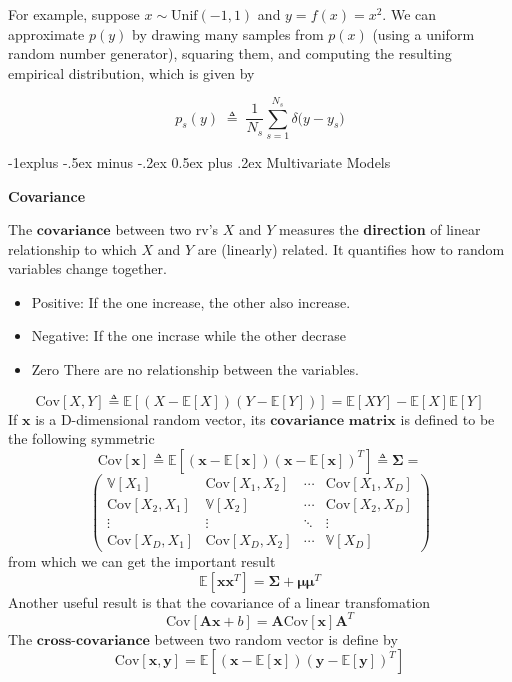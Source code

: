 \documentclass[10pt,landscape]{article}
\makeatletter
\newcommand{\cov}{\textrm{Cov}}
\newcommand{\mean}{\mathbb{E}}
\newcommand{\var}{\mathbb{V}}
\newcommand{\inp}{\textbf{x}}
\newcommand{\out}{\textbf{y}}
\newcommand{\Cov}{\mathbf{\Sigma}}
\newcommand{\Mean}{\boldsymbol{\mu}}
\renewcommand{\subsection}{\@startsection{subsection}{2}{0mm}%
                                {-1explus -.5ex minus -.2ex}%
                                {0.5ex plus .2ex}%
                                {\normalfont\normalsize\bfseries}}
\makeatother
\begin{document}
\begin{multicols*}{3}
For example, suppose $x \sim \mathrm{Unif}(-1,1)$ and $y = f(x) = x^2$. 
We can approximate $p(y)$ by drawing many samples from $p(x)$ 
(using a uniform random number generator), squaring them, and 
computing the resulting empirical distribution, which is given by

\begin{equation*}
p_s(y) \;\triangleq\; \frac{1}{N_s} \sum_{s=1}^{N_s} \delta\bigl(y - y_s\bigr)
\end{equation*}

\subsection{Multivariate Models}

\textbf{Covariance}

The $\textbf{covariance}$ between two rv's $X$ and $Y$ measures the \textbf{direction} of linear relationship to which $X$ and $Y$ are (linearly) related. It quantifies how to random variables change together.
\begin{itemize}
    \item Positive: If the one increase, the other also increase.
    \item Negative: If the one incrase while the other decrase
    \item Zero There are no relationship between the variables. 
\end{itemize}

\[
    \cov[X,Y]\triangleq\mean[(X-\mean[X])(Y-\mean[Y])]=\mean[XY]-\mean[X]\mean[Y]
\]
If $\inp$ is a D-dimensional random vector, its $\textbf{covariance matrix}$ is defined to be the following symmetric
\[
    \cov[\inp]\triangleq\mean[(\inp-\mean[\inp])(\inp-\mean[\inp])^T] \triangleq \boldsymbol{\Cov} = 
\]
\[
    \begin{pmatrix}
        \var[X_1] & \cov[X_1,X_2] & \cdots & \cov[X_1,X_D] \\
        \cov[X_2,X_1] & \var[X_2] & \cdots &\cov[X_2,X_D] \\
        \vdots & \vdots & \ddots & \vdots \\ 
        \cov[X_D,X_1] & \cov[X_D,X_2] & \cdots & \var[X_D]
    \end{pmatrix}
\]
from which we can get the important result
\[
    \mean[\inp\inp^T] = \Cov +\Mean\Mean^T
\]
Another useful result is that the covariance of a linear transfomation
\[
    \cov[\mathbf{A}\inp+b]=\mathbf{A}\cov[\inp]\mathbf{A}^T
\]
The $\textbf{cross-covariance}$ between two random vector is define by
\[
    \cov[\inp,\out]=\mean[(\inp-\mean[\inp])(\out-\mean[\out])^T]
\]


\end{multicols*}
\end{document}
